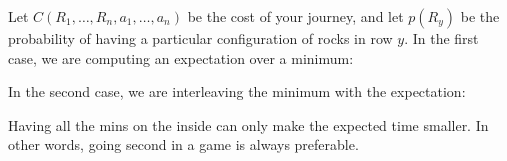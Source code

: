 \documentclass[4pt,landscape]{article}
\begin{document}
\begin{multicols*}{4}
{\tiny Let $C(R_1, \hdots , R_n, a_1, \hdots , a_n)$ be the cost of your journey, and let $p(R_y)$ be the probability of having a particular configuration of rocks in row $y$. In the first case, we are computing an expectation over a minimum:}\par
{}\par
{\tiny In the second case, we are interleaving the minimum with the expectation:}\par
{}\par
{\tiny Having all the mins on the inside can only make the expected time smaller. In other words,
going second in a game is always preferable.} \par


\end{multicols*}
\end{document}
